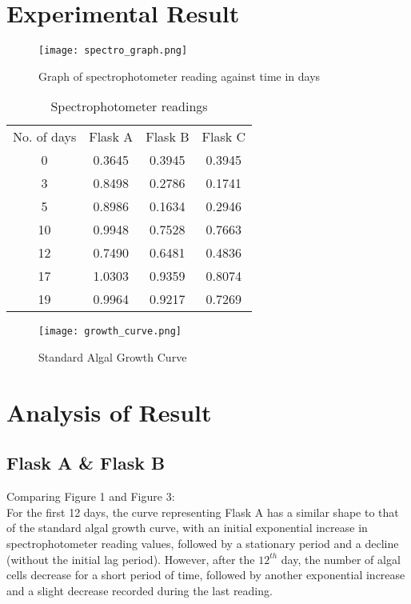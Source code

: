 \documentclass[12pt,a4paper]{IEEEtran}
\begin{document}
    \section{Experimental Result}
    \begin{figure}[H]
    	\begin{center}
    		\texttt{[image: spectro\_graph.png]}
    		\caption{Graph of spectrophotometer reading against time in days}
    		\label{fig:spectrograph}
    	\end{center}
    \end{figure} \vspace{-0.2in}
	\begin{table}[H]
		\centering
		\caption{Spectrophotometer readings}
		\label{tab:spectrotable}
		\small
		\begin{tabular}{|c|c|c|c|}
			No. of days & Flask A & Flask B & Flask C \\
			0           & 0.3645  & 0.3945  & 0.3945  \\
			3           & 0.8498  & 0.2786  & 0.1741  \\
			5           & 0.8986  & 0.1634  & 0.2946  \\
			10          & 0.9948  & 0.7528  & 0.7663  \\
			12          & 0.7490  & 0.6481  & 0.4836  \\
			17          & 1.0303  & 0.9359  & 0.8074  \\
			19          & 0.9964  & 0.9217  & 0.7269          
		\end{tabular}
		\normalsize
	\end{table}
	\begin{figure}[H]
		\begin{center}
			\texttt{[image: growth\_curve.png]}
			\caption{Standard Algal Growth Curve}
			\label{growthcurve}
		\end{center}
	\end{figure}
    \section{Analysis of Result}
    \subsection{Flask A \& Flask B}
    Comparing Figure 1 and Figure 3: \\
    
    For the first 12 days, the curve representing Flask A has a similar shape to that of the standard algal growth curve, with an initial exponential increase in spectrophotometer reading values, followed by a stationary period and a decline (without the initial lag period). However, after the $12^{th}$ day, the number of algal cells decrease for a short period of time, followed by another exponential increase and a slight decrease recorded during the last reading. \\
    
\end{document}
